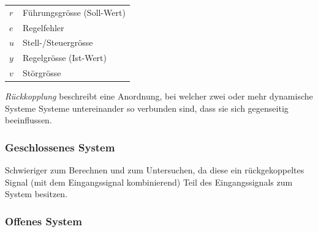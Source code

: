 \documentclass[
  10pt,
  a4paper,
]{article}
\makeatletter
\numberwithin{equation}{section}
\newenvironment{conditions}
  {\par\vspace{\abovedisplayskip}\noindent\begin{tabular}{>{$}l<{$} @{${}:{}$} l}}
  {\end{tabular}\par\vspace{\belowdisplayskip}}
\makeatother
\begin{document}
\begin{multicols}{2}
\begin{conditions}
  r & Führungsgrösse (Soll-Wert) \\
  e & Regelfehler \\
  u & Stell-/Steuergrösse \\
  y & Regelgrösse (Ist-Wert) \\
  v & Störgrösse
\end{conditions}

\emph{Rückkopplung} beschreibt eine Anordnung, bei welcher zwei oder
mehr dynamische Systeme Systeme untereinander so verbunden sind, dass
sie sich gegenseitig beeinflussen.

\hypertarget{geschlossenes-system}{%
\subsubsection{Geschlossenes System}\label{geschlossenes-system}}

\begin{center}
\end{center}

Schwieriger zum Berechnen und zum Untersuchen, da diese ein
rückgekoppeltes Signal (mit dem Eingangssignal kombinierend) Teil des
Eingangssignals zum System besitzen.

\hypertarget{offenes-system}{%
\subsubsection{Offenes System}\label{offenes-system}}

\begin{center}
\end{center}
\end{multicols}
\end{document}
